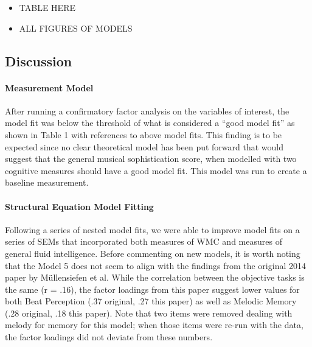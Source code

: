 \documentclass[]{book}
\let\oldparagraph\paragraph
\renewcommand{\paragraph}[1]{\oldparagraph{#1}\mbox{}}
\theoremstyle{definition}
\theoremstyle{definition}
\theoremstyle{definition}
\theoremstyle{remark}
\begin{document}
\begin{itemize}
\item
  TABLE HERE
\item
  ALL FIGURES OF MODELS
\end{itemize}

\hypertarget{discussion}{%
\subsection{Discussion}\label{discussion}}

\hypertarget{measurement-model-1}{%
\paragraph{Measurement Model}\label{measurement-model-1}}

After running a confirmatory factor analysis on the variables of
interest, the model fit was below the threshold of what is considered a
``good model fit'' as shown in Table 1 with references to above model
fits. This finding is to be expected since no clear theoretical model
has been put forward that would suggest that the general musical
sophistication score, when modelled with two cognitive measures should
have a good model fit. This model was run to create a baseline
measurement.

\hypertarget{structural-equation-model-fitting}{%
\paragraph{Structural Equation Model
Fitting}\label{structural-equation-model-fitting}}

Following a series of nested model fits, we were able to improve model
fits on a series of SEMs that incorporated both measures of WMC and
measures of general fluid intelligence. Before commenting on new models,
it is worth noting that the Model 5 does not seem to align with the
findings from the original 2014 paper by Müllensiefen et al. While the
correlation between the objective tasks is the same (r = .16), the
factor loadings from this paper suggest lower values for both Beat
Perception (.37 original, .27 this paper) as well as Melodic Memory (.28
original, .18 this paper). Note that two items were removed dealing with
melody for memory for this model; when those items were re-run with the
data, the factor loadings did not deviate from these numbers.
\end{document}
